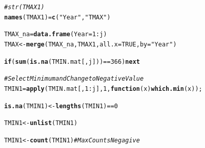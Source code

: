 \documentclass{article}\usepackage[]{graphicx}\usepackage[]{color}
\makeatletter
\newcommand{\hlnum}[1]{\textcolor[rgb]{0.686,0.059,0.569}{#1}}%
\newcommand{\hlstr}[1]{\textcolor[rgb]{0.192,0.494,0.8}{#1}}%
\newcommand{\hlcom}[1]{\textcolor[rgb]{0.678,0.584,0.686}{\textit{#1}}}%
\newcommand{\hlopt}[1]{\textcolor[rgb]{0,0,0}{#1}}%
\newcommand{\hlstd}[1]{\textcolor[rgb]{0.345,0.345,0.345}{#1}}%
\newcommand{\hlkwa}[1]{\textcolor[rgb]{0.161,0.373,0.58}{\textbf{#1}}}%
\newcommand{\hlkwb}[1]{\textcolor[rgb]{0.69,0.353,0.396}{#1}}%
\newcommand{\hlkwc}[1]{\textcolor[rgb]{0.333,0.667,0.333}{#1}}%
\newcommand{\hlkwd}[1]{\textcolor[rgb]{0.737,0.353,0.396}{\textbf{#1}}}%
\newenvironment{kframe}{%
 \def\at@end@of@kframe{}%
 \ifinner\ifhmode%
  \def\at@end@of@kframe{\end{minipage}}%
  \begin{minipage}{\columnwidth}%
 \fi\fi%
 \def\FrameCommand##1{\hskip\@totalleftmargin \hskip-\fboxsep
 \colorbox{shadecolor}{##1}\hskip-\fboxsep
     \hskip-\linewidth \hskip-\@totalleftmargin \hskip\columnwidth}%
 \MakeFramed {\advance\hsize-\width
   \@totalleftmargin\z@ \linewidth\hsize
   \@setminipage}}%
 {\par\unskip\endMakeFramed%
 \at@end@of@kframe}
\newenvironment{knitrout}{}{} %
\makeatother
\begin{document}
\begin{knitrout}
\begin{kframe}
{\ttfamily\noindent\bfseries\color{errorcolor}{\#\# Error in count(TMAX1): object 'TMAX1' not found}}\begin{alltt}
\hlcom{#str(TMAX1)}
\hlkwd{names}\hlstd{(TMAX1)}\hlkwb{=}\hlkwd{c}\hlstd{(}\hlstr{"Year"}\hlstd{,} \hlstr{"TMAX"}\hlstd{)}
\end{alltt}


{\ttfamily\noindent\bfseries{}}\begin{alltt}
\hlstd{TMAX_na} \hlkwb{=} \hlkwd{data.frame}\hlstd{(}\hlkwc{Year}\hlstd{=}\hlnum{1}\hlopt{:}\hlstd{j)}
\hlstd{TMAX} \hlkwb{<-} \hlkwd{merge}\hlstd{(TMAX_na, TMAX1,} \hlkwc{all.x}\hlstd{=}\hlnum{TRUE}\hlstd{,} \hlkwc{by}\hlstd{=}\hlstr{"Year"}\hlstd{)}
\end{alltt}


{\ttfamily\noindent\bfseries{}}\begin{alltt}
\hlkwa{if}\hlstd{(}\hlkwd{sum}\hlstd{(}\hlkwd{is.na}\hlstd{(TMIN.mat[,j]))}\hlopt{==}\hlnum{366}\hlstd{)} \hlkwa{next}
\end{alltt}


{\ttfamily\noindent\bfseries\color{errorcolor}{\#\# Error in TMIN.mat[, j]: subscript out of bounds}}\begin{alltt}
   \hlcom{# Select Minimum and Change to Negative Value}
\hlstd{TMIN1} \hlkwb{=} \hlkwd{apply}\hlstd{(TMIN.mat[,}\hlnum{1}\hlopt{:}\hlstd{j],} \hlnum{1}\hlstd{,} \hlkwa{function} \hlstd{(}\hlkwc{x}\hlstd{)} \hlkwd{which.min}\hlstd{(x));}
\end{alltt}


{\ttfamily\noindent\bfseries\color{errorcolor}{\#\# Error in TMIN.mat[, 1:j]: subscript out of bounds}}\begin{alltt}
\hlkwd{is.na}\hlstd{(TMIN1)} \hlkwb{<-} \hlkwd{lengths}\hlstd{(TMIN1)} \hlopt{==} \hlnum{0}
\end{alltt}


{\ttfamily\noindent\bfseries\color{errorcolor}{\#\# Error in lengths(TMIN1): object 'TMIN1' not found}}\begin{alltt}
\hlstd{TMIN1} \hlkwb{<-} \hlkwd{unlist}\hlstd{(TMIN1)}
\end{alltt}


{\ttfamily\noindent\bfseries\color{errorcolor}{\#\# Error in unlist(TMIN1): object 'TMIN1' not found}}\begin{alltt}
\hlstd{TMIN1} \hlkwb{<-} \hlkwd{count}\hlstd{(TMIN1)} \hlcom{# Max Counts Negagive}
\end{alltt}



\end{kframe}
\end{knitrout}
\end{document}

